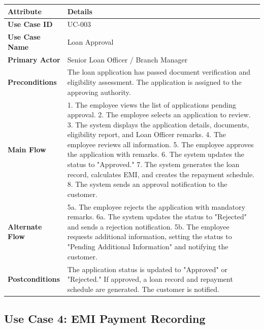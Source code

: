 \documentclass[12pt,a4paper,oneside]{report}
\begin{document}
\begin{table}[htbp]
\centering
\small
\begin{tabularx}{\textwidth}{l l}
\toprule
\textbf{Attribute} & \textbf{Details} \\
\midrule
\textbf{Use Case ID} & UC-003 \\
\textbf{Use Case Name} & Loan Approval \\
\textbf{Primary Actor} & Senior Loan Officer / Branch Manager \\
\textbf{Preconditions} & The loan application has passed document verification and eligibility assessment. The application is assigned to the approving authority. \\
\textbf{Main Flow} & 1. The employee views the list of applications pending approval. 2. The employee selects an application to review. 3. The system displays the application details, documents, eligibility report, and Loan Officer remarks. 4. The employee reviews all information. 5. The employee approves the application with remarks. 6. The system updates the status to "Approved." 7. The system generates the loan record, calculates EMI, and creates the repayment schedule. 8. The system sends an approval notification to the customer. \\
\textbf{Alternate Flow} & 5a. The employee rejects the application with mandatory remarks. 6a. The system updates the status to "Rejected" and sends a rejection notification. 5b. The employee requests additional information, setting the status to "Pending Additional Information" and notifying the customer. \\
\textbf{Postconditions} & The application status is updated to "Approved" or "Rejected." If approved, a loan record and repayment schedule are generated. The customer is notified. \\
\bottomrule
\end{tabularx}
\end{table}

\subsection{Use Case 4: EMI Payment Recording}
\end{document}
